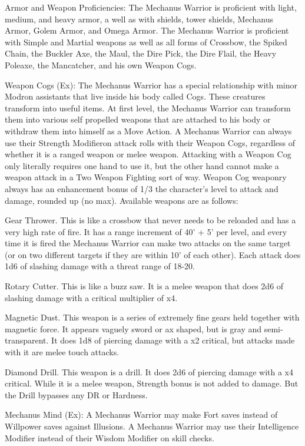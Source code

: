 Armor and Weapon Proficiencies: The Mechanus Warrior is proficient with light, medium, and heavy armor, a well as with shields, tower shields, Mechanus Armor, Golem Armor, and Omega Armor. The Mechanus Warrior is proficient with Simple and Martial weapons as well as all forms of Crossbow, the Spiked Chain, the Buckler Axe, the Maul, the Dire Pick, the Dire Flail, the Heavy Poleaxe, the Mancatcher, and his own Weapon Cogs.


\ability{}{}
Weapon Cogs (Ex): The Mechanus Warrior has a special relationship with minor Modron assistants that live inside his body called Cogs. These creatures transform into useful items. At first level, the Mechanus Warrior can transform them into various self propelled weapons that are attached to his body or withdraw them into himself as a Move Action. A Mechanus Warrior can always use their Strength Modifieron attack rolls with their Weapon Cogs, regardless of whether it is a ranged weapon or melee weapon. Attacking with a Weapon Cog only literally requires one hand to use it, but the other hand cannot make a weapon attack in a Two Weapon Fighting sort of way. Weapon Cog weaponry always has an enhancement bonus of 1/3 the character's level to attack and damage, rounded up (no max). Available weapons are as follows:

    Gear Thrower. This is like a crossbow that never needs to be reloaded and has a very high rate of fire. It has a range increment of 40' + 5' per level, and every time it is fired the Mechanus Warrior can make two attacks on the same target (or on two different targets if they are within 10' of each other). Each attack does 1d6 of slashing damage with a threat range of 18-20.

    Rotary Cutter. This is like a buzz saw. It is a melee weapon that does 2d6 of slashing damage with a critical multiplier of x4.

    Magnetic Dust. This weapon is a series of extremely fine gears held together with magnetic force. It appears vaguely sword or ax shaped, but is gray and semi-transparent. It does 1d8 of piercing damage with a x2 critical, but attacks made with it are melee touch attacks.

    Diamond Drill. This weapon is a drill. It does 2d6 of piercing damage with a x4 critical. While it is a melee weapon, Strength bonus is not added to damage. But the Drill bypasses any DR or Hardness.



Mechanus Mind (Ex): A Mechanus Warrior may make Fort saves instead of Willpower saves against Illusions. A Mechanus Warrior may use their Intelligence Modifier instead of their Wisdom Modifier on skill checks.

